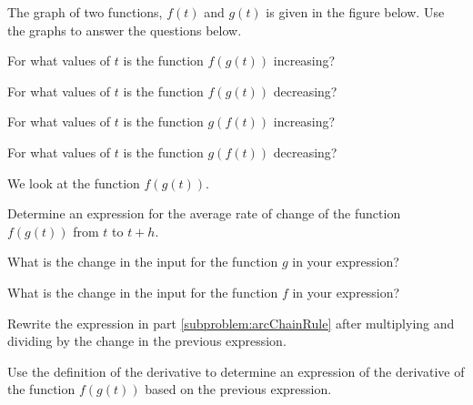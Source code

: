 \begin{problem}
\item The graph of two functions, $f(t)$ and $g(t)$ is given in the
  figure below. Use the graphs to answer the questions below.

  \scalebox{0.75}{}

  \begin{subproblem}
  \item For what values of $t$ is the function $f(g(t))$ increasing?
    \vfill
  \item For what values of $t$ is the function $f(g(t))$ decreasing?
    \vfill
  \item For what values of $t$ is the function $g(f(t))$ increasing?
    \vfill
  \item For what values of $t$ is the function $g(f(t))$ decreasing?
    \vfill
  \end{subproblem}

  \clearpage


\item We look at the function $f(g(t))$.
  \begin{subproblem}
  \item Determine an expression for the average rate of change of the
    function $f(g(t))$ from $t$ to $t+h$.
    \label{subproblem:arcChainRule}
    \vfill
  \item What is the change in the input for the function $g$ in your
    expression?
    \vspace{2em}
  \item What is the change in the input for the function $f$ in your
    expression?
    \vspace{2em}
  \item Rewrite the expression in part \ref{subproblem:arcChainRule}
    after multiplying and dividing by the change in the previous
    expression.
    \vfill
  \end{subproblem}

\item Use the definition of the derivative to determine an expression
  of the derivative of the function $f(g(t))$ based on the previous
  expression.
  \vspace{5em}

\end{problem}


